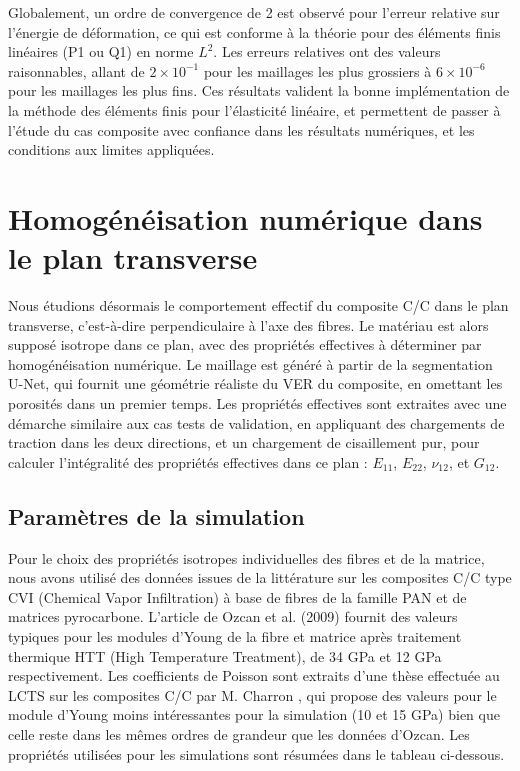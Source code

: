 \documentclass[a4paper,11pt]{article}
\begin{document}
Globalement, un ordre de convergence de 2 est observé pour l'erreur relative sur l'énergie de déformation, ce qui est conforme à la théorie pour des éléments finis linéaires (P1 ou Q1) en norme $L^2$. Les erreurs relatives ont des valeurs raisonnables, allant de $2\times10^{-1}$ pour les maillages les plus grossiers à $6\times10^{-6}$ pour les maillages les plus fins. Ces résultats valident la bonne implémentation de la méthode des éléments finis pour l'élasticité linéaire, et permettent de passer à l'étude du cas composite avec confiance dans les résultats numériques, et les conditions aux limites appliquées.

\section{Homogénéisation numérique dans le plan transverse}

Nous étudions désormais le comportement effectif du composite C/C dans le plan transverse, c'est-à-dire perpendiculaire à l'axe des fibres. Le matériau est alors supposé isotrope dans ce plan, avec des propriétés effectives à déterminer par homogénéisation numérique. Le maillage est généré à partir de la segmentation U-Net, qui fournit une géométrie réaliste du VER du composite, en omettant les porosités dans un premier temps. Les propriétés effectives sont extraites avec une démarche similaire aux cas tests de validation, en appliquant des chargements de traction dans les deux directions, et un chargement de cisaillement pur, pour calculer l'intégralité des propriétés effectives dans ce plan : $E_{11}$, $E_{22}$, $\nu_{12}$, et $G_{12}$. \\ 

\subsection{Paramètres de la simulation}
Pour le choix des propriétés isotropes individuelles des fibres et de la matrice, nous avons utilisé des données issues de la littérature sur les composites C/C type CVI (Chemical Vapor Infiltration) à base de fibres de la famille PAN et de matrices pyrocarbone. L'article de Ozcan et al. (2009) \cite{OzcanCC} fournit des valeurs typiques pour les modules d'Young de la fibre et matrice après traitement thermique HTT (High Temperature Treatment), de 34 GPa et 12 GPa respectivement. Les coefficients de Poisson sont extraits d'une thèse effectuée au LCTS sur les composites C/C par M. Charron \cite{CharronCC}, qui propose des valeurs pour le module d'Young moins intéressantes pour la simulation (10 et 15 GPa) bien que celle reste dans les mêmes ordres de grandeur que les données d'Ozcan. Les propriétés utilisées pour les simulations sont résumées dans le tableau ci-dessous.
\end{document}
